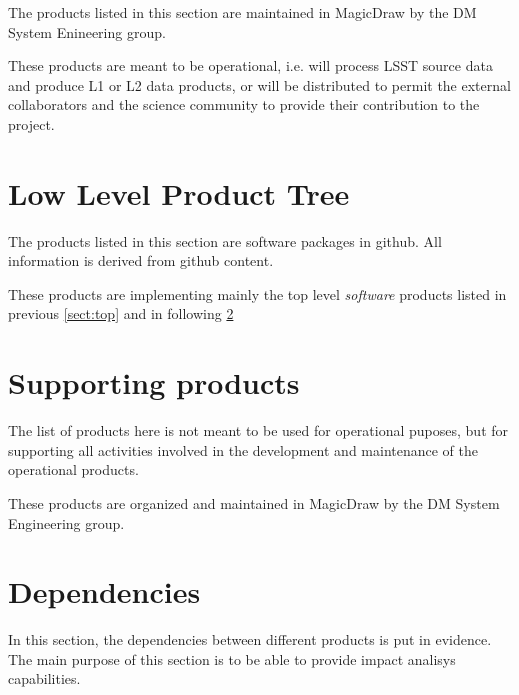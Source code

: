 The products listed in this section are maintained in MagicDraw by the DM System Enineering group. 

These products are meant to be operational, i.e. will process LSST source data and produce L1 or L2 data products, or will be distributed to permit the external collaborators and the science community to provide their contribution to the project.



\section{Low Level Product Tree}\label{sect:low}

The products listed in this section are software packages in github.
All information is derived from github content.

These products are implementing mainly the top level \textit{software} products listed in previous \ref{sect:top} and in following \ref{sect:sups}


\section{Supporting products}\label{sect:sups}

The list of products here is not meant to be used for operational puposes, but for supporting all activities involved in the development and maintenance of the operational products. 

These products are organized and maintained in MagicDraw by the DM System Engineering group.


\section{Dependencies}\label{sect:deps}

In this section, the dependencies between different products is put in evidence.
The main purpose of this section is to be able to provide impact analisys capabilities.
